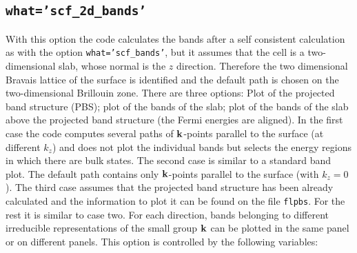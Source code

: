 \documentclass[12pt,a4paper]{article}
\begin{document}
\subsection{\texttt{what='scf\_2d\_bands'}}
With this option the code calculates the bands after a self consistent 
calculation as with the option \texttt{what='scf\_bands'}, but it assumes 
that the cell is a two-dimensional slab, whose
normal is the $z$ direction. Therefore the two dimensional
Bravais lattice of the surface is identified and the default path is chosen 
on the two-dimensional Brillouin zone. 
There are three options: Plot of the projected band structure (PBS); 
plot of the bands of the slab; plot of the bands of the slab above the
projected band structure (the Fermi energies are aligned). In the first 
case the code computes several paths
of ${\bf k}$-points parallel to the surface (at different $k_z$) and does 
not plot the individual bands but selects the energy regions in which 
there are bulk states. The second case is similar to a standard band plot. 
The default path contains only ${\bf k}$-points parallel to the 
surface (with $k_z=0$). The third case assumes that the projected band 
structure has been already calculated and the information to plot it 
can be found on the file \texttt{flpbs}. For the rest it is 
similar to case two. For each direction, bands belonging to different 
irreducible representations of the small group ${\bf k}$ can be plotted 
in the same panel or on different panels.
This option is controlled by the following variables:
\end{document}
